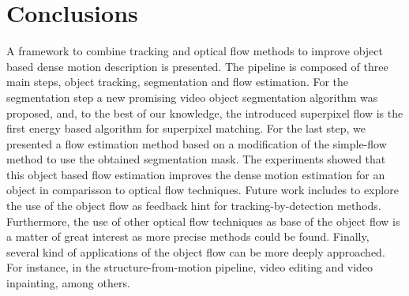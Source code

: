 \section{Conclusions}

A framework to combine tracking and optical flow methods to improve 
object based dense motion description is presented. The pipeline is 
composed of three main steps, object tracking, segmentation and 
flow estimation. For the segmentation step a new promising video object 
segmentation algorithm was proposed, and, to the best of our knowledge, 
the introduced superpixel flow is the first energy based algorithm for superpixel matching.
For the last step, we presented a flow estimation method based on a modification of the simple-flow method to use 
the obtained segmentation mask. The experiments showed that this object based flow estimation improves the dense motion 
estimation for an object in comparisson to optical flow techniques.
Future work includes to explore the use of the object flow as feedback hint for tracking-by-detection methods. 
Furthermore, the use of other optical flow techniques as base of the object flow is a matter of great interest as more precise methods could be found.
Finally, several kind of applications of the object flow can be more deeply approached. For instance, 
in the structure-from-motion pipeline, video editing and video inpainting, among others.



